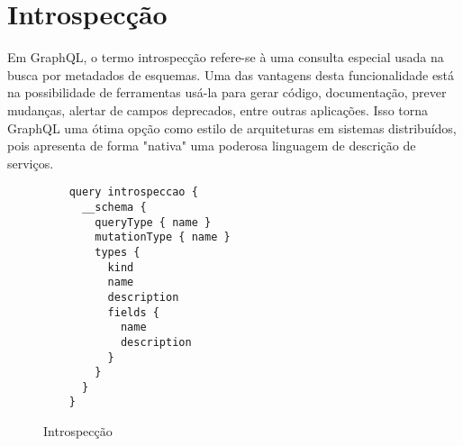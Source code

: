 \section[Introspecção]{Introspecção}

Em GraphQL, o termo introspecção refere-se à uma consulta especial usada na busca por metadados de esquemas. Uma das vantagens desta funcionalidade está na possibilidade de ferramentas usá-la para gerar código, documentação, prever mudanças, alertar de campos deprecados, entre outras aplicações. Isso torna GraphQL uma ótima opção como estilo de arquiteturas em sistemas distribuídos, pois apresenta de forma "nativa" uma poderosa linguagem de descrição de serviços.

\begin{figure}[H]
  \centering
  \begin{verbatim}
    query introspeccao {
      __schema {
        queryType { name }
        mutationType { name }
        types {
          kind
          name
          description
          fields {
            name
            description
          }
        }
      }
    }
  \end{verbatim}
  \caption{Introspecção}
\end{figure}
